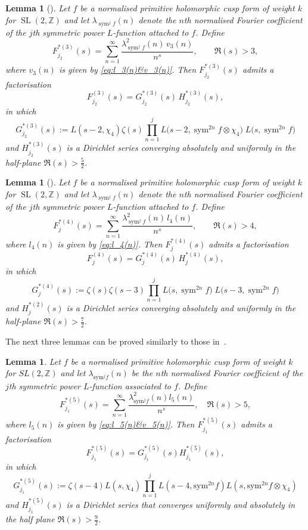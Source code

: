 \documentclass[10pt]{amsart}
\newtheorem{lemma}[theorem]{Lemma}
\begin{document}
\begin{lemma}[{\cite{SharmaSankaranarayanan2023}}]\label{lem:F3*''}
Let \(f\) be a normalised primitive holomorphic cusp form of weight \(k\) for \(\operatorname{SL}(2,\mathbb{Z})\)
and let \(\lambda_{\operatorname{sym}^{j}f}(n)\) denote the \(n\)th normalised Fourier coefficient 
of the \(j\)th symmetric power \(L\)-function attached to \(f\). Define
\[
F_{j_2}^{*(3)}(s)=\sum_{n=1}^{\infty}\frac{\lambda_{\operatorname{sym}^{j}f}^2(n)\,v_3(n)}{n^{s}}, \qquad \Re(s)>3,
\]
where \(v_3(n)\) is given by \eqref{eq:l_3(n)&v_3(n)}. Then \(F_{j_2}^{*(3)}(s)\) admits a factorisation
\[
F_{j_2}^{(3)}(s)=G_{j_2}^{*(3)}(s)\,H_{j_2}^{*(3)}(s),
\]
in which
\[
G_{j_2}^{*(3)}(s):=L(s-2,\chi_4)\zeta(s)\prod_{n=1}^{j}L\!\bigl(s-2,\operatorname{sym}^{2n}f \otimes \chi_4\bigr)\; 
        L\!\bigl(s,\operatorname{sym}^{2n}f\bigr)
\]
and \(H_{j_2}^{*(3)}(s)\) is a Dirichlet series converging absolutely and uniformly 
in the half-plane \(\Re(s)>\frac{5}{2}\).
\end{lemma}

\begin{lemma}[{\cite{PanWang2025}}]\label{lem:F4*}
Let \(f\) be a normalised primitive holomorphic cusp form of weight \(k\) for \(\operatorname{SL}(2,\mathbb{Z})\) 
and let \(\lambda_{\operatorname{sym}^{j}f}(n)\) denote the \(n\)th normalised Fourier coefficient 
of the \(j\)th symmetric power \(L\)-function attached to \(f\). Define
\[
F_{j}^{*(4)}(s)=\sum_{n=1}^{\infty}\frac{\lambda_{\operatorname{sym}^{j}f}^2(n)\,l_4(n)}{n^{s}}, \qquad \Re(s)>4,
\]
where \(l_4(n)\) is given by \eqref{eq:l_4(n)}. Then \(F_{j}^{*(4)}(s)\) admits a factorisation
\[
F_{j}^{(4)}(s)=G_{j}^{*(4)}(s)\,H_{j}^{*(4)}(s),
\]
in which
\[
G_{j}^{*(4)}(s):=\zeta(s)\zeta(s-3)\prod_{n=1}^{j}L\!\bigl(s,\operatorname{sym}^{2n}f\bigr)\; 
        L\!\bigl(s-3,\operatorname{sym}^{2n}f\bigr)
\]
and \(H_{j}^{*(2)}(s)\) is a Dirichlet series converging absolutely and uniformly 
in the half-plane \(\Re(s)>\frac{7}{2}\).
\end{lemma}

The next three lemmas can be proved similarly to those in~\cite{Kaur2026, PanWang2025, SharmaSankaranarayanan2023}.

\begin{lemma} \label{lem:F5*'}
Let $f$ be a normalised primitive holomorphic cusp form of weight $k$ for $SL(2,\mathbb{Z})$ and let $\lambda_{\mathrm{sym}^{j}f}(n)$ be the $n$th normalised Fourier coefficient of the $j$th symmetric power $L$-function associated to $f$. Define
\[
F_{j_1}^{*(5)}(s)=\sum_{n=1}^{\infty}\frac{\lambda_{\mathrm{sym}^{j}f}^{2}(n)l_5(n)}{n^{s}}, \quad \Re(s) > 5,
\]
where \(l_5(n)\) is given by \eqref{eq:l_5(n)&v_5(n)}. Then $F_{j_1}^{*(5)}(s)$ admits a factorisation
\[
F_{j_1}^{*(5)}(s)=G_{j_1}^{*(5)}(s)H_{j_1}^{*(5)}(s),
\]
in which
\[
G_{j_1}^{*(5)}(s):=\zeta(s-4)L(s,\chi_4)\prod_{n=1}^{j}L(s-4,\mathrm{sym}^{2n}f)L(s,\mathrm{sym}^{2n}f\otimes\chi_4)
\]
and $H_{j_1}^{*(5)}(s)$ is a Dirichlet series that converges uniformly and absolutely in the half plane $\Re(s)>\frac{9}{2}$. 
\end{lemma}
\end{document}
